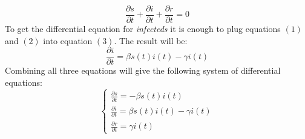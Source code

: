 \begin{equation}
	\frac{\partial s}{\partial t} + \frac{\partial i}{\partial t}+\frac{\partial r}{\partial t} = 0
\end{equation}
To get the differential equation for \textit{infecteds} it is enough to plug equations $(1)$ and $(2)$ into equation $(3)$.
The result will be:
\begin{equation}
	\frac{\partial i}{\partial t} = \beta s(t)  i(t) - \gamma i(t)
\end{equation}
Combining all three equations will give the following system of differential equations:
\[
	\left\{
	\begin{array}{l}
		\frac{\partial s}{\partial t} = -\beta s(t)  i(t)  \\    
		\frac{\partial i}{\partial t} = \beta s(t)  i(t) - \gamma i(t) \\
		\frac{\partial r}{\partial t} = \gamma i(t)
	\end{array}
	\right.
\]